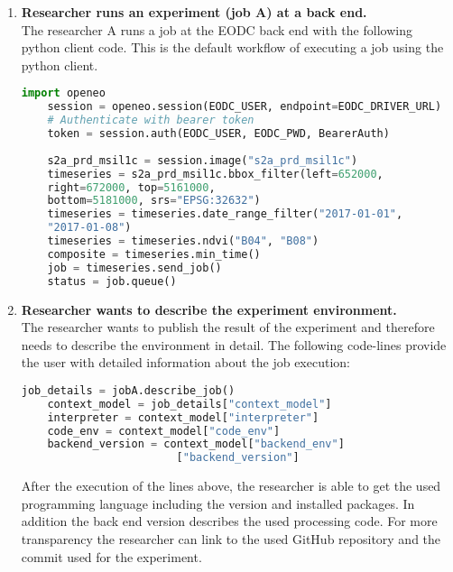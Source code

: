 \documentclass[draft,final]{vutinfth} %
\begin{document}
\begin{enumerate}
	\item \textbf{Researcher runs an experiment (job A) at a back end.}\\
	The researcher A runs a job at the EODC back end with the following python client code. This is the default workflow of executing a job using the python client.  
	\begin{lstlisting}[frame=single, language=Python]
	import openeo
	session = openeo.session(EODC_USER, endpoint=EODC_DRIVER_URL)
	# Authenticate with bearer token
	token = session.auth(EODC_USER, EODC_PWD, BearerAuth)
	
	s2a_prd_msil1c = session.image("s2a_prd_msil1c")
	timeseries = s2a_prd_msil1c.bbox_filter(left=652000, 
	right=672000, top=5161000,
	bottom=5181000, srs="EPSG:32632")
	timeseries = timeseries.date_range_filter("2017-01-01", 
	"2017-01-08")
	timeseries = timeseries.ndvi("B04", "B08")
	composite = timeseries.min_time()
	job = timeseries.send_job()
	status = job.queue()
	\end{lstlisting}
	\item \textbf{Researcher wants to describe the experiment environment.}\\
	The researcher wants to publish the result of the experiment and therefore needs to describe the environment in detail. The following code-lines provide the user with detailed information about the job execution:
	\begin{lstlisting}[frame=single, language=Python]
	job_details = jobA.describe_job()
	context_model = job_details["context_model"]
	interpreter = context_model["interpreter"]
	code_env = context_model["code_env"]
	backend_version = context_model["backend_env"]
						["backend_version"]
	\end{lstlisting}
	After the execution of the lines above, the researcher is able to get the used programming language including the version and installed packages. In addition the back end version describes the used processing code. For more transparency the researcher can link to the used GitHub repository and the commit used for the experiment. 
	
\end{enumerate}
\end{document}
